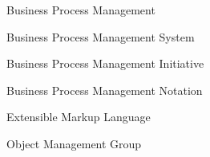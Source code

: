 \item [BPM] Business Process Management
\item [BPMS] Business Process Management System
\item [BPMI] Business Process Management Initiative
\item [BPMN] Business Process Management Notation
\item [XML] Extensible Markup Language
\item [OMG] Object Management Group


